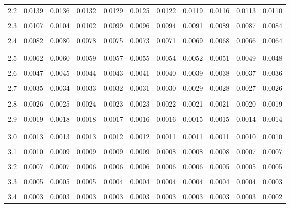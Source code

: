 \documentclass{report}
\begin{document}
\begin{center}
\begin{tabular*}{\linewidth}{@{\extracolsep{\fill}} |c|c|ccc|ccc|ccc|}
    \\[-1em]
    2.2 & 0.0139 & 0.0136 & 0.0132 & 0.0129 & 0.0125 & 0.0122 & 0.0119 & 0.0116 & 0.0113 & 0.0110 \\
    \\[-1em]
    2.3 & 0.0107 & 0.0104 & 0.0102 & 0.0099 & 0.0096 & 0.0094 & 0.0091 & 0.0089 & 0.0087 & 0.0084 \\
    \\[-1em]
    2.4 & 0.0082 & 0.0080 & 0.0078 & 0.0075 & 0.0073 & 0.0071 & 0.0069 & 0.0068 & 0.0066 & 0.0064 \\
    \\[-1em]
    \hline
    \\[-1em]
    2.5 & 0.0062 & 0.0060 & 0.0059 & 0.0057 & 0.0055 & 0.0054 & 0.0052 & 0.0051 & 0.0049 & 0.0048 \\
    \\[-1em]
    2.6 & 0.0047 & 0.0045 & 0.0044 & 0.0043 & 0.0041 & 0.0040 & 0.0039 & 0.0038 & 0.0037 & 0.0036 \\
    \\[-1em]
    2.7 & 0.0035 & 0.0034 & 0.0033 & 0.0032 & 0.0031 & 0.0030 & 0.0029 & 0.0028 & 0.0027 & 0.0026 \\
    \\[-1em]
    2.8 & 0.0026 & 0.0025 & 0.0024 & 0.0023 & 0.0023 & 0.0022 & 0.0021 & 0.0021 & 0.0020 & 0.0019 \\
    \\[-1em]
    2.9 & 0.0019 & 0.0018 & 0.0018 & 0.0017 & 0.0016 & 0.0016 & 0.0015 & 0.0015 & 0.0014 & 0.0014 \\
    \\[-1em]
    \hline
    \\[-1em]
    3.0 & 0.0013 & 0.0013 & 0.0013 & 0.0012 & 0.0012 & 0.0011 & 0.0011 & 0.0011 & 0.0010 & 0.0010 \\
    \\[-1em]
    3.1 & 0.0010 & 0.0009 & 0.0009 & 0.0009 & 0.0009 & 0.0008 & 0.0008 & 0.0008 & 0.0007 & 0.0007 \\
    \\[-1em]
    3.2 & 0.0007 & 0.0007 & 0.0006 & 0.0006 & 0.0006 & 0.0006 & 0.0006 & 0.0005 & 0.0005 & 0.0005 \\
    \\[-1em]
    3.3 & 0.0005 & 0.0005 & 0.0005 & 0.0004 & 0.0004 & 0.0004 & 0.0004 & 0.0004 & 0.0004 & 0.0003 \\
    \\[-1em]
    3.4 & 0.0003 & 0.0003 & 0.0003 & 0.0003 & 0.0003 & 0.0003 & 0.0003 & 0.0003 & 0.0003 & 0.0002 \\
    \hline
  \end{tabular*}
\end{center}
\end{document}
